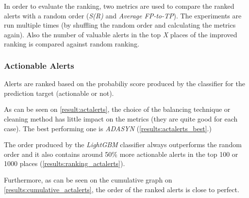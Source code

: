 In order to evaluate the ranking, two metrics are used to compare the ranked alerts with a random order (\textit{S(R)} and \textit{Average FP-to-TP}). The experiments are run multiple times (by shuffling the random order and calculating the metrics again). Also the number of valuable alerts in the top \textit{X} places of the improved ranking is compared against random ranking.


\subsubsection{Actionable Alerts}

Alerts are ranked based on the probabiliy score produced by the classifier for the prediction target (actionable or not).

As can be seen on \cref{result:actalerts}, the choice of the balancing technique or cleaning method has little impact on the metrics (they are quite good for each case). The best performing one is \textit{ADASYN} (\cref{results:actalerts_best}.) 

The order produced by the \textit{LightGBM} classifier always outperforms the random order and it also contains around 50\% more actionable alerts in the top 100 or 1000 places (\cref{results:ranking_actalerts}).

Furthermore, as can be seen on the cumulative graph on \cref{results:cumulative_actalerts}, the order of the ranked alerts is close to perfect.

